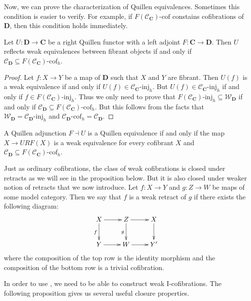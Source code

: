 \documentclass{tac}
\theoremstyle{definition}
\newcommand{\we}{\mathcal{W}}
\newcommand{\cof}{\mathcal{C}}
\newcommand{\cat}[1]{\mathbf{#1}}
\newcommand{\C}{\cat{C}}
\newcommand{\D}{\cat{D}}
\newcommand{\I}{\mathrm{I}}
\newcommand{\class}[2]{#1\text{-}\mathrm{#2}}
\newcommand{\Iinj}[1][\I]{\class{#1}{inj}}
\newcommand{\Icof}[1][\I]{\class{#1}{cof}}
\begin{document}
Now, we can prove the characterization of Quillen equivalences.
Sometimes this condition is easier to verify.
For example, if $\Icof[F(\cof_\C)]$ constains cofibrations of $\D$, then this condition holds immediately.

\begin{prop}
Let $U : \D \to \C$ be a right Quillen functor with a left adjoint $F : \C \to \D$.
Then $U$ reflects weak equivalences between fibrant objects if and only if $\cof_\D \subseteq \Icof[F(\cof_\C)]_h$.
\end{prop}
\begin{proof}
Let $f : X \to Y$ be a map of $\D$ such that $X$ and $Y$ are fibrant.
Then $U(f)$ is a weak equivalence if and only if $U(f) \in \Iinj[\cof_\C]_h$.
But $U(f) \in \Iinj[\cof_\C]_h$ if and only if $f \in \Iinj[F(\cof_\C)]_h$.
Thus we only need to prove that $\Iinj[F(\cof_\C)]_h \subseteq \we_\D$ if and only if $\cof_\D \subseteq \Icof[F(\cof_\C)]_h$.
But this follows from the facts that $\we_\D = \Iinj[\cof_\D]_h$ and $\Icof[\cof_\D]_h = \cof_\D$.
\end{proof}

\begin{cor}
A Quillen adjunction $F \dashv U$ is a Quillen equivalence if and only if the map $X \to URF(X)$ is a weak equivalence for every cofibrant $X$ and $\cof_\D \subseteq \Icof[F(\cof_\C)]_h$.
\end{cor}

Just as ordinary cofibrations, the class of weak cofibrations is closed under retracts as we will see in the proposition below.
But it is also closed under weaker notion of retracts that we now introduce.
Let $f : X \to Y$ and $g : Z \to W$ be maps of some model category.
Then we say that $f$ is a weak retract of $g$ if there exists the following diagram:
\[ \xymatrix{ X \ar[r] \ar[d]_f & Z \ar[r] \ar[d]_g & X \ar[d] \\
              Y \ar[r]          & W \ar[r]          & Y'
            } \]
where the composition of the top row is the identity morphism and the composition of the bottom row is a trivial cofibration.

In order to use , we need to be able to construct weak $\I$-cofibrations.
The following proposition gives us several useful closure properties.
\end{document}
